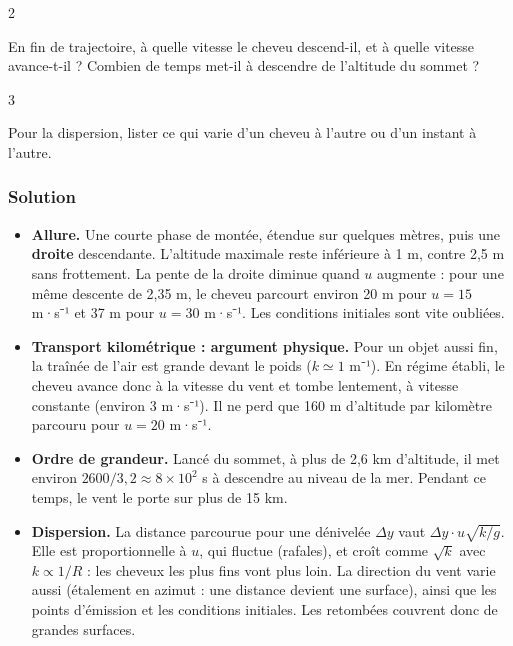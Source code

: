 \documentclass[11pt,a4paper]{article}
\providecommand{\tightlist}{\setlength{\itemsep}{0pt}\setlength{\parskip}{0pt}}
\begin{document}
\begin{indication}{2}

En fin de trajectoire, à quelle vitesse le cheveu descend-il, et à quelle vitesse avance-t-il ? Combien de temps met-il à descendre de l'altitude du sommet ?

\end{indication}

\begin{indication}{3}

Pour la dispersion, lister ce qui varie d'un cheveu à l'autre ou d'un instant à l'autre.

\end{indication}

\hypertarget{solution-29}{%
\subsubsection{Solution}\label{solution-29}}

\begin{itemize}
\tightlist
\item
  \textbf{Allure.} Une courte phase de montée, étendue sur quelques mètres, puis une \textbf{droite} descendante. L'altitude maximale reste inférieure à 1 m, contre 2,5 m sans frottement. La pente de la droite diminue quand \(u\) augmente : pour une même descente de 2,35 m, le cheveu parcourt environ 20 m pour \(u = 15\) m·s⁻¹ et 37 m pour \(u = 30\) m·s⁻¹. Les conditions initiales sont vite oubliées.
\item
  \textbf{Transport kilométrique : argument physique.} Pour un objet aussi fin, la traînée de l'air est grande devant le poids (\(k \simeq 1\) m⁻¹). En régime établi, le cheveu avance donc à la vitesse du vent et tombe lentement, à vitesse constante (environ 3 m·s⁻¹). Il ne perd que 160 m d'altitude par kilomètre parcouru pour \(u = 20\) m·s⁻¹.
\item
  \textbf{Ordre de grandeur.} Lancé du sommet, à plus de 2,6 km d'altitude, il met environ \(2600/3{,}2 \approx 8\times10^2\) s à descendre au niveau de la mer. Pendant ce temps, le vent le porte sur plus de 15 km.
\item
  \textbf{Dispersion.} La distance parcourue pour une dénivelée \(\Delta y\) vaut \(\Delta y\cdot u\sqrt{k/g}\). Elle est proportionnelle à \(u\), qui fluctue (rafales), et croît comme \(\sqrt{k}\) avec \(k \propto 1/R\) : les cheveux les plus fins vont plus loin. La direction du vent varie aussi (étalement en azimut : une distance devient une surface), ainsi que les points d'émission et les conditions initiales. Les retombées couvrent donc de grandes surfaces.
\end{itemize}
\end{document}
